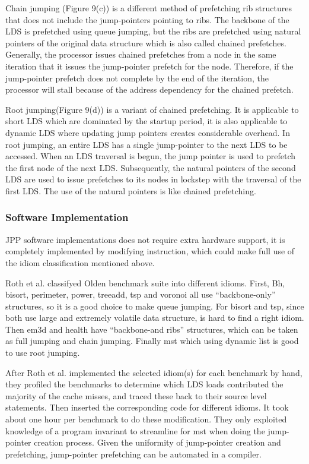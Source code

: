 \documentclass{acm_proc_article-sp}
\begin{document}
Chain jumping (Figure 9(c)) is a different method of prefetching rib
structures that does not include  the jump-pointers pointing to
ribs. The backbone of the LDS is 
prefetched using queue jumping, but the ribs 
are prefetched using natural pointers of the original data
structure which is also  called chained prefetches. Generally, the
processor issues chained 
prefetches from a node in the same iteration that it issues the
jump-pointer prefetch for the node. Therefore, if the jump-pointer
prefetch does not complete by the end of the iteration, the processor
will stall because of the address dependency for the chained prefetch. 
 
Root jumping(Figure 9(d)) is a variant of chained prefetching. It is
applicable to short LDS which are dominated by the 
startup period, it is also applicable to dynamic LDS where updating
jump pointers creates considerable overhead. In root
jumping, an entire LDS has a single jump-pointer to the next LDS to be
accessed. When an LDS traversal is begun, the jump pointer is used to
prefetch the first node of the next LDS. Subsequently, 
the natural pointers of the second LDS are used to issue prefetches to
its nodes in lockstep with the traversal of the first LDS. The use of
the natural pointers is like chained prefetching.

\subsubsection{Software Implementation}

JPP software implementations does not require extra hardware support,
it is completely implemented by modifying instruction, which could
make full use of the idiom classification mentioned above.

Roth et al. classifyed Olden benchmark suite into different idioms.
First, Bh, bisort, perimeter, power, treeadd, tsp and voronoi all
use “backbone-only” structures, so it is a good choice to make queue
jumping. For bisort and tsp, since both use large and extremely
volatile data structure, is hard to find a right idiom. Then em3d and
health  have “backbone-and ribs” structures, which can be taken as
full jumping and chain jumping. Finally mst which using dynamic list
is good to use root jumping.

After Roth et al. implemented the selected idiom(s) for each benchmark
by hand, they profiled the benchmarks to determine
which LDS loads contributed the majority of the cache
misses, and traced these back to their source level statements. Then
inserted the corresponding code for different idioms. It took about
one hour per benchmark to do these modification.
They only exploited knowledge of a program invariant
to streamline for mst when doing the jump-pointer creation
process. Given the uniformity of jump-pointer creation and
prefetching, jump-pointer prefetching can be automated in a 
compiler. 
\end{document}

